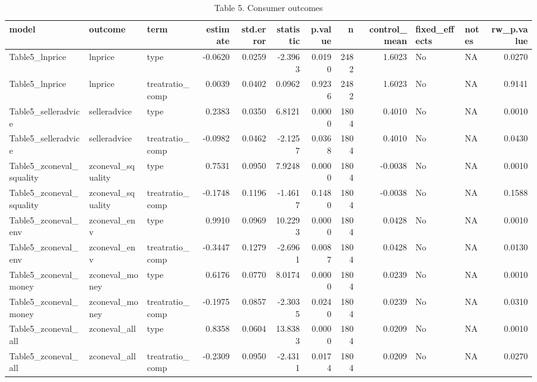 \begin{table}

\caption{Table 5. Consumer outcomes}
\centering
\begin{tabular}[t]{lllrrrrrrllr}
\toprule
model & outcome & term & estimate & std.error & statistic & p.value & n & control\_mean & fixed\_effects & notes & rw\_p.value\\
\midrule
Table5\_lnprice & lnprice & type & -0.0620 & 0.0259 & -2.3963 & 0.0190 & 2482 & 1.6023 & No & NA & 0.0270\\
Table5\_lnprice & lnprice & treatratio\_comp & 0.0039 & 0.0402 & 0.0962 & 0.9236 & 2482 & 1.6023 & No & NA & 0.9141\\
Table5\_selleradvice & selleradvice & type & 0.2383 & 0.0350 & 6.8121 & 0.0000 & 1804 & 0.4010 & No & NA & 0.0010\\
Table5\_selleradvice & selleradvice & treatratio\_comp & -0.0982 & 0.0462 & -2.1257 & 0.0368 & 1804 & 0.4010 & No & NA & 0.0430\\
Table5\_zconeval\_squality & zconeval\_squality & type & 0.7531 & 0.0950 & 7.9248 & 0.0000 & 1804 & -0.0038 & No & NA & 0.0010\\
\addlinespace
Table5\_zconeval\_squality & zconeval\_squality & treatratio\_comp & -0.1748 & 0.1196 & -1.4617 & 0.1480 & 1804 & -0.0038 & No & NA & 0.1588\\
Table5\_zconeval\_env & zconeval\_env & type & 0.9910 & 0.0969 & 10.2293 & 0.0000 & 1804 & 0.0428 & No & NA & 0.0010\\
Table5\_zconeval\_env & zconeval\_env & treatratio\_comp & -0.3447 & 0.1279 & -2.6961 & 0.0087 & 1804 & 0.0428 & No & NA & 0.0130\\
Table5\_zconeval\_money & zconeval\_money & type & 0.6176 & 0.0770 & 8.0174 & 0.0000 & 1804 & 0.0239 & No & NA & 0.0010\\
Table5\_zconeval\_money & zconeval\_money & treatratio\_comp & -0.1975 & 0.0857 & -2.3035 & 0.0240 & 1804 & 0.0239 & No & NA & 0.0310\\
\addlinespace
Table5\_zconeval\_all & zconeval\_all & type & 0.8358 & 0.0604 & 13.8383 & 0.0000 & 1804 & 0.0209 & No & NA & 0.0010\\
Table5\_zconeval\_all & zconeval\_all & treatratio\_comp & -0.2309 & 0.0950 & -2.4311 & 0.0174 & 1804 & 0.0209 & No & NA & 0.0270\\
\bottomrule
\end{tabular}
\end{table}

